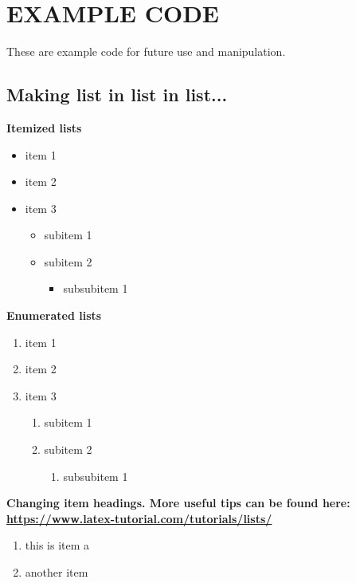 \documentclass[../main/main.tex]{subfiles}
\begin{document}
\section*{EXAMPLE CODE}
These are example code for future use and manipulation.

\subsection*{Making list in list in list...}
\textbf{Itemized lists}
\begin{itemize}
\item item 1
\item item 2
\item item 3
	\begin{itemize}
	\item subitem 1
	\item subitem 2
		\begin{itemize}
		\item subsubitem 1
		\end{itemize}
	\end{itemize}
\end{itemize}

\noindent \textbf{Enumerated lists}
\begin{enumerate}
\item item 1
\item item 2
\item item 3
	\begin{enumerate}
	\item subitem 1
	\item subitem 2
		\begin{enumerate}
		\item subsubitem 1
		\end{enumerate}
	\end{enumerate}
\end{enumerate}

\noindent \textbf{Changing item headings. More useful tips can be found here: \url{https://www.latex-tutorial.com/tutorials/lists/}}
\begin{enumerate}[label=\Alph*.]
\item this is item a
\item another item
\end{enumerate}
\end{document}
